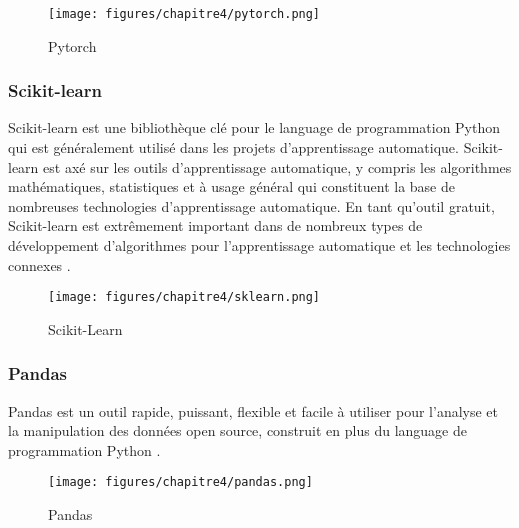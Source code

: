         
        
        \begin{figure}[H]
        	\begin{center}
        		\texttt{[image: figures/chapitre4/pytorch.png]}
        	\end{center}
        	\caption {Pytorch}
        	\label{fig:pytorch}
        \end{figure}     
        
        \subsubsection{Scikit-learn}
        \par Scikit-learn est une bibliothèque clé pour le language de programmation Python qui est généralement utilisé dans les projets d’apprentissage automatique. Scikit-learn est axé sur les outils d’apprentissage automatique, y compris les algorithmes mathématiques, statistiques et à usage général qui constituent la base de nombreuses technologies d’apprentissage automatique. En tant qu’outil gratuit, Scikit-learn est extrêmement important dans de nombreux types de développement d’algorithmes pour l’apprentissage automatique et les technologies connexes \cite{scikit}.
        
        \begin{figure}[H]
        	\begin{center}
        		\texttt{[image: figures/chapitre4/sklearn.png]}
        	\end{center}
        	\caption {Scikit-Learn}
        	\label{fig:scikit}
        \end{figure}  
        
        \subsubsection{Pandas}
        \par Pandas est un outil rapide, puissant, flexible et facile à utiliser pour l’analyse et la manipulation des données open source, construit en plus du language de programmation Python \cite{pandas}.

        \begin{figure}[H]
        	\begin{center}
        		\texttt{[image: figures/chapitre4/pandas.png]}
        	\end{center}
        	\caption {Pandas}
        	\label{fig:pandas}
        \end{figure}  
        
